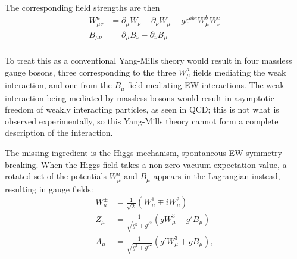 The corresponding field strengths are then
\begin{equation*}
  \begin{split}
  W^a_{\mu\nu} &= \partial_\mu W_\nu - \partial_\nu W_\mu
               + g \varepsilon^{abc}W^b_\mu W^c_\nu \\
  B_{\mu\nu}   &= \partial_\mu B_\nu - \partial_\nu B_\mu \\
  \end{split}
\end{equation*}

To treat this as a conventional Yang-Mills theory would result in four massless
gauge bosons, three corresponding to the three $W^a_\mu$ fields mediating the
weak interaction, and one from the $B_\mu$ field mediating \ac{EW} interactions.
The weak interaction being mediated by massless bosons would result in
asymptotic freedom of weakly interacting particles, as seen in \ac{QCD}; this is
not what is observed experimentally, so this Yang-Mills theory cannot form a
complete description of the interaction.

The missing ingredient is the Higgs mechanism, spontaneous \ac{EW} symmetry
breaking. When the Higgs field takes a non-zero vacuum expectation value,
a rotated set of the potentials $W^a_\mu$ and $B_\mu$ appears in the Lagrangian
instead, resulting in gauge fields:
\begin{equation*}
  \begin{split}
    W_\mu^\pm &= \frac1{\sqrt2} (W_\mu^1 \mp iW_\mu^2) \\
    Z_\mu     &= \frac1{\sqrt{g^2 + g'^2}}( gW_\mu^3 - g' B_\mu ) \\
    A_\mu     &= \frac1{\sqrt{g^2 + g'^2}}( g'W_\mu^3 + g B_\mu ), \\
  \end{split}
\end{equation*}
%

